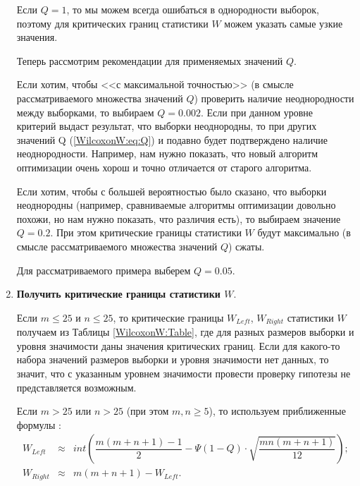 \documentclass[a4paper,12pt]{article}
\begin{document}
\begin{enumerate}
Если $Q=1$, то мы можем всегда ошибаться в однородности выборок, поэтому для критических границ статистики $W$ можем указать самые узкие значения.

Теперь рассмотрим рекомендации для применяемых значений $Q$.  

Если хотим, чтобы <<с максимальной точностью>> (в смысле рассматриваемого множества значений $Q$) проверить наличие неоднородности между выборками, то выбираем $Q = 0.002$. Если при данном уровне критерий выдаст результат, что выборки неоднородны, то при других значений Q (\ref{WilcoxonW:eq:Q}) и подавно будет подтверждено наличие неоднородности.  Например, нам нужно показать, что новый алгоритм оптимизации очень хорош и точно отличается от старого алгоритма.

Если хотим, чтобы с большей вероятностью было сказано, что выборки неоднородны (например, сравниваемые алгоритмы оптимизации довольно похожи, но нам нужно показать, что различия есть), то выбираем значение $Q = 0.2$. При этом критические границы статистики $W$ будут максимально (в смысле рассматриваемого множества значений $Q$) сжаты.

Для рассматриваемого примера выберем $ Q=0.05 $.

\item \textbf{Получить критические границы статистики $W$}.

Если $m\leq 25$ и $n\leq 25$, то критические границы $W_{Left}$, $W_{Right}$ статистики $W$ получаем из Таблицы \ref{WilcoxonW:Table}, где для разных размеров выборки и уровня значимости даны значения критических границ. Если для какого-то набора значений размеров выборки и уровня значимости нет данных, то значит, что с указанным уровнем значимости провести проверку гипотезы не представляется возможным.

Если $m > 25$ или  $n > 25$ (при этом $m,n \geq 5$), то используем приближенные формулы  \cite[с. 95]{book:Bolshev1983}:
\begin{eqnarray}
W_{Left}&\approx& int \left( \dfrac{m\left( m+n+1\right)-1 }{2} - \Psi\left( 1-Q\right)\cdot\sqrt{\dfrac{mn\left( m+n+1\right) }{12}} \right);\\
W_{Right}&\approx& m\left( m+n+1\right) - W_{Left}.
\end{eqnarray}


\end{enumerate}
\end{document}
